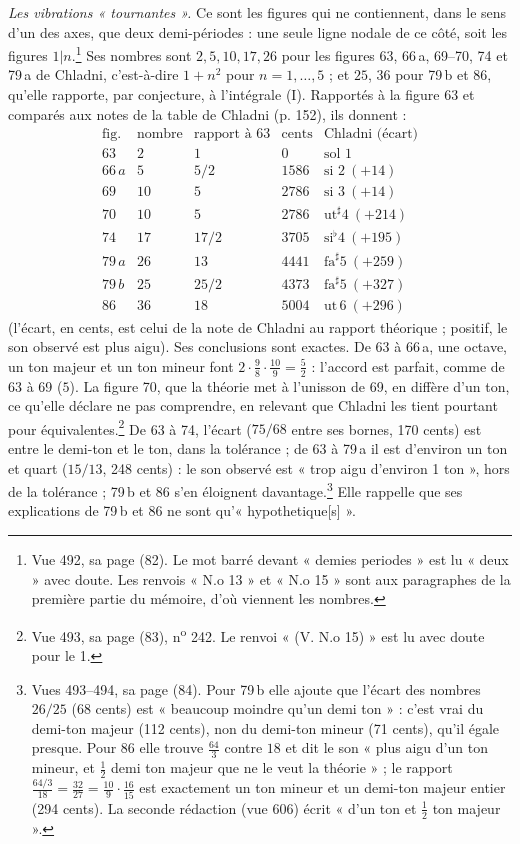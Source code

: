 \documentclass[11pt,a4paper]{article}
\begin{document}
\emph{Les vibrations « tournantes ».} Ce sont les figures qui ne contiennent,
dans le sens d'un des axes, que deux demi-périodes : une seule ligne nodale
de ce côté, soit les figures $1|n$.\footnote{Vue 492, sa page (82). Le mot
barré devant « demies periodes » est lu « deux » avec doute. Les renvois
« N.o 13 » et « N.o 15 » sont aux paragraphes de la première partie du mémoire,
d'où viennent les nombres.} Ses nombres sont $2, 5, 10, 17, 26$ pour les
figures 63, 66\,a, 69--70, 74 et 79\,a de Chladni, c'est-à-dire $1+n^2$ pour
$n = 1, \dots, 5$ ; et $25$, $36$ pour 79\,b et 86, qu'elle rapporte, par
conjecture, à l'intégrale (I). Rapportés à la figure 63 et comparés aux notes
de la table de Chladni (p. 152), ils donnent :
\[
\begin{array}{lcccl}
\text{fig.} & \text{nombre} & \text{rapport à 63} & \text{cents} & \text{Chladni (écart)}\\
63 & 2 & 1 & 0 & \text{sol 1}\\
66\,a & 5 & 5/2 & 1586 & \text{si 2}\ (+14)\\
69 & 10 & 5 & 2786 & \text{si 3}\ (+14)\\
70 & 10 & 5 & 2786 & \text{ut}^{\sharp}4\ (+214)\\
74 & 17 & 17/2 & 3705 & \text{si}^{\flat}4\ (+195)\\
79\,a & 26 & 13 & 4441 & \text{fa}^{\sharp}5\ (+259)\\
79\,b & 25 & 25/2 & 4373 & \text{fa}^{\sharp}5\ (+327)\\
86 & 36 & 18 & 5004 & \text{ut}\,6\ (+296)
\end{array}
\]
(l'écart, en cents, est celui de la note de Chladni au rapport théorique ;
positif, le son observé est plus aigu). Ses conclusions sont exactes. De 63 à
66\,a, une octave, un ton majeur et un ton mineur font $2\cdot\frac98\cdot\frac{10}{9}
= \frac52$ : l'accord est parfait, comme de 63 à 69 ($5$). La figure 70, que
la théorie met à l'unisson de 69, en diffère d'un ton, ce qu'elle déclare ne pas
comprendre, en relevant que Chladni les tient pourtant pour
équivalentes.\footnote{Vue 493, sa page (83), n\textsuperscript{o} 242. Le
renvoi « (V. N.o 15) » est lu avec doute pour le 1.} De 63 à 74, l'écart
($75/68$ entre ses bornes, 170 cents) est entre le demi-ton et le ton, dans la
tolérance ; de 63 à 79\,a il est d'environ un ton et quart ($15/13$, 248 cents) :
le son observé est « trop aigu d'environ 1 ton », hors de la tolérance ;
79\,b et 86 s'en éloignent davantage.\footnote{Vues 493--494, sa page (84). Pour
79\,b elle ajoute que l'écart des nombres $26/25$ (68 cents) est « beaucoup
moindre qu'un demi ton » : c'est vrai du demi-ton majeur (112 cents), non du
demi-ton mineur (71 cents), qu'il égale presque. Pour 86 elle trouve
$\frac{64}{3}$ contre $18$ et dit le son « plus aigu d'un ton mineur, et
$\frac12$ demi ton majeur que ne le veut la théorie » ; le rapport
$\frac{64/3}{18} = \frac{32}{27} = \frac{10}{9}\cdot\frac{16}{15}$ est
exactement un ton mineur et un demi-ton majeur entier (294 cents). La seconde
rédaction (vue 606) écrit « d'un ton et $\frac12$ ton majeur ».} Elle rappelle
que ses explications de 79\,b et 86 ne sont qu'« hypothetique[s] ».
\end{document}
